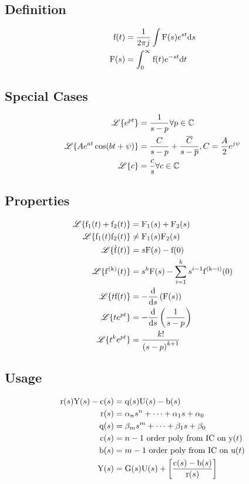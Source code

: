 \documentclass[8pt]{extarticle}
\begin{document}
\begin{multicols*}{3}
\subsection*{Definition}
\begin{align*}
    \func{f}[t] &= \frac{1}{2 \pi j} \intidef{\func{F}[s] e^{st}}[s] \\
    \func{F}[s] &= \intdef{0}{\infty}{\func{f}[t] e^{-st}}{t}
\end{align*}

\subsection*{Special Cases}
\begin{align*}
    \laplace{e^{pt}} &= \frac{1}{s-p} \forall p \in \mathbb{C} \\
    \laplace{Ae^{at}\cos{bt+\psi}} &= \frac{C}{s-p}+\frac{\overline{C}}{s-\overline{p}}, C = \frac{A}{2}e^{j\psi} \\
    \laplace{c} &= \frac{c}{s} \forall c \in \mathbb{C}
\end{align*}

\subsection*{Properties}
\begin{align*}
    \laplace{\func{f_1}[t] + \func{f_2}[t]} &= \func{F_1}[s]+\func{F_2}[s] \\
    \laplace{\func{f_1}[t]\func{f_2}[t]} &\neq \func{F_1}[s]\func{F_2}[s] \\
    \laplace{\func{\dot{f}}[t]} &= s \func{F}[s] - \func{f}[0] \\
    \laplace{\func{f^{(k)}}[t]} &= s^{k} \func{F}[s] - \sum_{i=1}^{k} s^{i-1}\func{f^{(k-i)}}[0] \\
    \laplace{t \func{f}[t]} &= -\deriv{s}{\func{F}[s]} \\
    \laplace{t e^{pt}} &= -\deriv{s}{\frac{1}{s-p}} \\
    \laplace{t^{k} e^{pt}} &= \frac{k!}{{(s-p)}^{k+1}}
\end{align*}

\subsection*{Usage}
\begin{align*}
    \func{r}[s]\func{Y}[s]-\func{c}[s] &= \func{q}[s]\func{U}[s]-\func{b}[s] \\
    \func{r}[s] &= \alpha_n s^n + \cdots + \alpha_1 s + \alpha_0 \\
    \func{q}[s] &= \beta_m s^m + \cdots + \beta_1 s + \beta_0 \\
    \func{c}[s] &= n-1 \text{ order poly from IC on } \func{y}[t] \\
    \func{b}[s] &= m-1 \text{ order poly from IC on } \func{u}[t] \\
    \func{Y}[s] &= \func{G}[s]\func{U}[s]+\left[\frac{\func{c}[s]-\func{b}[s]}{\func{r}[s]}\right]
\end{align*}


\end{multicols*}
\end{document}
